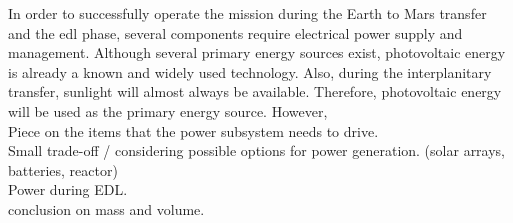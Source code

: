 In order to successfully operate the mission during the Earth to Mars transfer and the \gls{edl} phase, several components require electrical power supply and management. Although several primary energy sources exist, photovoltaic energy is already a known and widely used technology. Also, during the interplanitary transfer, sunlight will almost always be available. Therefore, photovoltaic energy will be used as the primary energy source. However,    \\

Piece on the items that the power subsystem needs to drive.\\

Small trade-off / considering possible options for power generation. (solar arrays, batteries, reactor)\\

Power during EDL.\\

conclusion on mass and volume.\\





